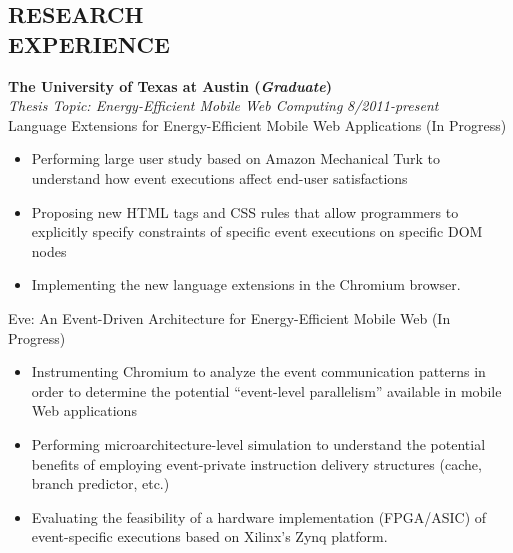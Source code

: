 \documentclass[margin, 9pt]{res} %
\begin{document}
\begin{resume}
\section{RESEARCH\\ EXPERIENCE}

{\large\textbf{The University of Texas at Austin (\textit{Graduate})}}\\

\vspace*{-7pt}
{\large\textit{Thesis Topic: Energy-Efficient Mobile Web Computing}} \hfill\textit{8/2011-present}\\

\vspace*{-7pt}
Language Extensions for Energy-Efficient Mobile Web Applications \hfill(In Progress)\\
\vspace*{-10pt}
\begin{itemize}[leftmargin=*] \itemsep -3pt
\vspace*{-5pt}
	\item Performing large user study based on Amazon Mechanical Turk to understand how event executions affect end-user satisfactions
	\item Proposing new HTML tags and CSS rules that allow programmers to explicitly specify constraints of specific event executions on specific DOM nodes
	\item Implementing the new language extensions in the Chromium browser.
\end{itemize}

\medskip
Eve: An Event-Driven Architecture for Energy-Efficient Mobile Web \hfill(In Progress)\\
\vspace*{-10pt}
\begin{itemize}[leftmargin=*] \itemsep -3pt
\vspace*{-5pt}
	\item Instrumenting Chromium to analyze the event communication patterns in order to determine the potential ``event-level parallelism'' available in mobile Web applications
	\item Performing microarchitecture-level simulation to understand the potential benefits of employing event-private instruction delivery structures (cache, branch predictor, etc.)
	\item Evaluating the feasibility of a hardware implementation (FPGA/ASIC) of event-specific executions based on Xilinx's Zynq platform.
\end{itemize}


\end{resume}
\end{document}
